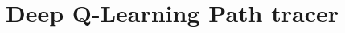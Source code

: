 \documentclass[ %
                    author={Callum Pearce},
                supervisor={Dr. Neill Campbell},
                    degree={MEng},
                     title={How effective are Temporal difference learning methods in reducing the number of zero contribution light paths in Path tracing?},
                  subtitle={},
                      type={research},
                      year={2019} ]{dissertation}
\begin{document}

\chapter{Deep Q-Learning Path tracer}
\label{chap:deep-q}

\begin{comment}
{\bf A topic-specific chapter, of roughly $15$ pages} 
\vspace{1cm} 

\noindent
This chapter is intended to describe what you did: the goal is to explain
the main activity or activities, of any type, which constituted your work 
during the project.  The content is highly topic-specific, but for many 
projects it will make sense to split the chapter into two sections: one 
will discuss the design of something (e.g., some hardware or software, or 
an algorithm, or experiment), including any rationale or decisions made, 
and the other will discuss how this design was realised via some form of 
implementation.  

This is, of course, far from ideal for {\em many} project topics.  Some
situations which clearly require a different approach include:

\begin{itemize}
\item In a project where asymptotic analysis of some algorithm is the goal,
      there is no real ``design and implementation'' in a traditional sense
      even though the activity of analysis is clearly within the remit of
      this chapter.
\item In a project where analysis of some results is as major, or a more
      major goal than the implementation that produced them, it might be
      sensible to merge this chapter with the next one: the main activity 
      is such that discussion of the results cannot be viewed separately.
\end{itemize}

\noindent
Note that it is common to include evidence of ``best practice'' project 
management (e.g., use of version control, choice of programming language 
and so on).  Rather than simply a rote list, make sure any such content 
is useful and/or informative in some way: for example, if there was a 
decision to be made then explain the trade-offs and implications 
involved.

\section{Example Section}


\end{comment}
\end{document}
